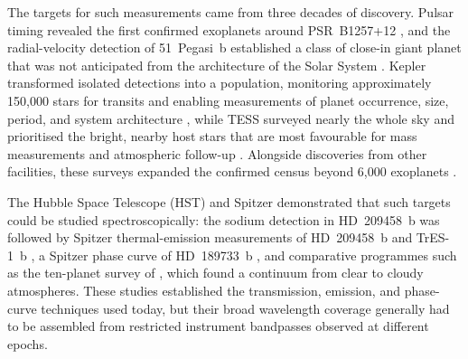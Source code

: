 The targets for such measurements came from three decades of discovery. Pulsar
timing revealed the first confirmed exoplanets around PSR~B1257+12
\citep{WolszczanFrail1992}, and the radial-velocity detection of 51~Pegasi~b
established a class of close-in giant planet that was not anticipated from the
architecture of the Solar System \citep{MayorQueloz1995}. Kepler transformed
isolated detections into a population, monitoring approximately 150,000 stars
for transits and enabling measurements of planet occurrence, size, period, and
system architecture \citep{BoruckiEtAl2010,WinnFabrycky2015}, while TESS
surveyed nearly the whole sky and prioritised the bright, nearby host stars
that are most favourable for mass measurements and atmospheric follow-up
\citep{RickerEtAl2015}. Alongside discoveries from other facilities, these
surveys expanded the confirmed census beyond 6,000 exoplanets
\citep{NASAExoplanetArchive2026}.


The Hubble Space Telescope (HST) and Spitzer demonstrated that such targets
could be studied spectroscopically: the sodium detection in HD~209458~b
\citep{CharbonneauEtAl2002} was followed by Spitzer thermal-emission
measurements of HD~209458~b and TrES-1~b
\citep{DemingEtAl2005,CharbonneauEtAl2005}, a Spitzer phase curve of
HD~189733~b \citep{KnutsonEtAl2007}, and comparative programmes such as the
ten-planet survey of \citet{SingEtAl2016}, which found a continuum from clear
to cloudy atmospheres. These studies established the transmission, emission,
and phase-curve techniques used today, but their broad wavelength coverage
generally had to be assembled from restricted instrument bandpasses observed
at different epochs.


